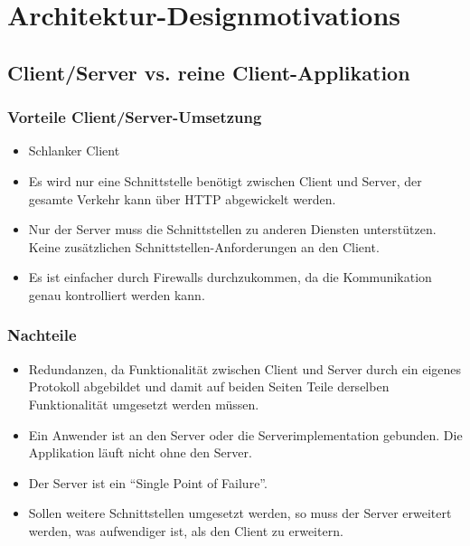 \section{Architektur-Designmotivations}
	\subsection{Client/Server vs. reine Client-Applikation}
		\subsubsection{Vorteile Client/Server-Umsetzung}
		\begin{itemize}
			\item Schlanker Client
			\item Es wird nur eine Schnittstelle benötigt zwischen Client und Server, der gesamte Verkehr kann über HTTP abgewickelt werden.
			\item Nur der Server muss die Schnittstellen zu anderen Diensten
			unterstützen. Keine zusätzlichen Schnittstellen-Anforderungen an den Client.
			\item Es ist einfacher durch Firewalls durchzukommen, da die Kommunikation genau kontrolliert werden kann.
		\end{itemize}
		\subsubsection{Nachteile}
		\begin{itemize}
			\item Redundanzen, da Funktionalität zwischen Client und Server durch
			ein eigenes Protokoll abgebildet und damit auf beiden Seiten Teile derselben
			Funktionalität umgesetzt werden müssen.
			\item Ein Anwender ist an den Server oder die Serverimplementation gebunden.
			Die Applikation läuft nicht ohne den Server.
			\item Der Server ist ein ``Single Point of Failure''.
			\item Sollen weitere Schnittstellen umgesetzt werden, so muss der Server
			erweitert werden, was aufwendiger ist, als den Client zu erweitern.
		\end{itemize}


